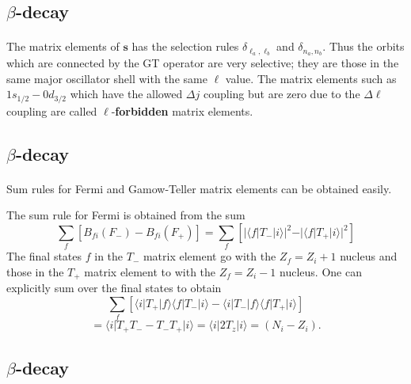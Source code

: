 \documentclass[%
twoside,                 %
final,                   %
10pt]{article}
\begin{document}
\subsection*{$\beta$-decay}

\paragraph{}
The matrix elements of $\mathbf{s}$ has the selection rules $\delta_{ \ell_{a} , \ell_{b} }$
and $\delta_{n _{a} ,n _{b} }$. Thus the orbits which are connected by the GT operator
are very selective; they are those in the same major oscillator shell
with the same $\ell$ value. The matrix elements such as
$1s_{1/2}-0d_{3/2}$ which have the allowed $\Delta j$ coupling but
are zero due to the $\Delta\ell$ coupling are called $\ell$-\textbf{forbidden} matrix
elements.



\subsection*{$\beta$-decay}

\paragraph{}
Sum rules for Fermi and Gamow-Teller matrix elements can be obtained easily.

The sum rule for Fermi is obtained from the sum
\[
\sum _{f} \left[ B_{fi}(F_{-}) - B_{fi}(F_{+}) \right]
=\sum _{f} \left[ \vert \langle f\vert  T_{-} \vert i\rangle\vert ^{2} -  \vert \langle f\vert  T_{+} \vert 
i\rangle\vert ^{2} \right]
\]
The final states $f$ in the $T_{-}$ matrix element go
with the $Z_{f}=Z_{i}+1$ nucleus and those in the $T_{+}$ matrix element
to with the $Z_{f}=Z_{i}-1$ nucleus. One can explicitly sum over the
final states to obtain
\[
\sum _{f} \left[ \langle i\vert  T_{+} \vert f\rangle \langle f\vert T_{-}\vert i\rangle -  \langle i\vert  T_{-} \vert f\rangle \langle f\vert T_{+}\vert i\rangle \right]
\]
\[
= \langle i\vert  T_{+} T_{-} -  T_{-} T_{+}\vert i\rangle =\langle i\vert  2T_{z}\vert i\rangle  = (N_{i}-Z_{i}).       
\]



\subsection*{$\beta$-decay}
\end{document}
